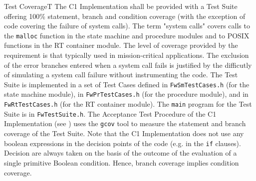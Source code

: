 \documentclass[a4paper,10pt]{article}
\newenvironment{fw_req_note}[7]
{\addtocounter{subsubsection}{1}
	\hspace{0.2cm}\textbf{FW-\arabic{section}.\arabic{subsection}.\arabic{subsubsection}/#2
	\hspace{0.8cm} #1}
	\vspace{-10pt}
\begin{longtable}{p{2.7cm}P{8.5cm}}
\hline
\textsc{Requirement} & #3 \\
\textsc{Note} & #4 \\
\textsc{Justification} & #5 \\
\textsc{Implementation} & #6  \\ 
\textsc{Verification} & #7  \\
\hline
}
{\end{longtable}}
\begin{document}
\begin{fw_req_note}{Test Coverage}{T}
{The C1 Implementation shall be provided with a Test Suite offering 
100\% statement, branch and condition coverage 
(with the exception of code covering the failure of system calls).}
{The term "system calls" covers calls to the \texttt{malloc} function in the state machine and procedure modules and to POSIX functions in the RT container module.}
{The level of coverage provided by the requirement is that typically 
used in mission-critical applications. 
The exclusion of the error branches entered when a system call fails is justified 
by the difficutly of simulating a system call failure without instrumenting the code.}
{The Test Suite is implemented in a set of Test Cases defined 
in \texttt{FwSmTestCases.h} (for the state machine module), in \texttt{FwPrTestCases.h} 
(for the procedure module), and in \texttt{FwRtTestCases.h} 
(for the RT container module). 
The \texttt{main} program for the Test Suite is in \texttt{FwTestSuite.h}.} 
{The Acceptance Test Procedure of the C1 Implementation (see \cite{ref:um}) uses the \texttt{gcov} tool to measure the statement and branch coverage of the Test Suite. 
Note that the C1 Implementation does not use any boolean expressions in the decision 
points of the code (e.g. in the \texttt{if} clauses). 
Decision are always taken on the basis of the outcome of the evaluation of a 
single primitive Boolean condition. 
Hence, branch coverage implies condition coverage.}
\end{fw_req_note}
\end{document}
